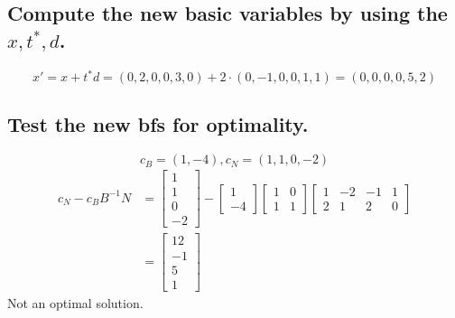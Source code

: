 \documentclass[11pt]{article}
\begin{document}
\subsection{Compute the new basic variables by using the $x, t^*, d$.}
$$x' = x + t^*d = (0, 2, 0, 0, 3, 0) + 2 \cdot (0, -1, 0, 0, 1, 1) = (0, 0, 0, 0, 5, 2)$$

\subsection{Test the new bfs for optimality.}
$$c_B = (1, -4), c_N = (1, 1, 0, -2)$$
\begin{align*}
    c_N - c_B B^{-1} N &= \begin{bmatrix} 1 \\ 1 \\ 0 \\ -2\end{bmatrix} - \begin{bmatrix} 1 \\ -4\end{bmatrix} \begin{bmatrix} 1 & 0 \\ 1 & 1\end{bmatrix} \begin{bmatrix} 1 & -2 & -1 & 1 \\ 2 & 1 & 2 & 0\end{bmatrix} \\
    &=\begin{bmatrix} 12 \\ -1 \\ 5 \\ 1\end{bmatrix}
\end{align*}
Not an optimal solution.
\end{document}
